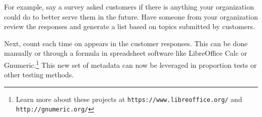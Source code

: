 For example, say a survey asked customers if there is anything your organization could do to better serve them in the future. Have someone from your organization review the responses and generate a list based on topics submitted by customers. 

Next, count each time on appears in the customer responses. This can be done manually or through a formula in spreadsheet software like LibreOffice Calc or Gnumeric.\footnote{Learn more about these projects at \texttt{https://www.libreoffice.org/} and \texttt{http://gnumeric.org/}} This new set of metadata can now be leveraged in proportion tests or other testing methods.